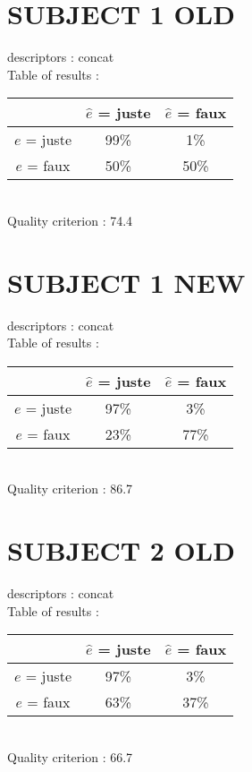 \newpage
\section*{SUBJECT 1 OLD}
descriptors : concat \\
Table of results : \\
\begin{tabular}{|c|c|c|}
\hline				& $\hat{e}$ = juste & $\hat{e}$ = faux \\
\hline  $e$ = juste	&     99\%			&      1\%		\\
\hline  $e$ = faux	&     50\%			&     50\%		\\
\hline
\end{tabular}\\
Quality criterion :   74.4 \\

\newpage
\section*{SUBJECT 1 NEW}
descriptors : concat \\
Table of results : \\
\begin{tabular}{|c|c|c|}
\hline				& $\hat{e}$ = juste & $\hat{e}$ = faux \\
\hline  $e$ = juste	&     97\%			&      3\%		\\
\hline  $e$ = faux	&     23\%			&     77\%		\\
\hline
\end{tabular}\\
Quality criterion :   86.7 \\

\newpage
\section*{SUBJECT 2 OLD}
descriptors : concat \\
Table of results : \\
\begin{tabular}{|c|c|c|}
\hline				& $\hat{e}$ = juste & $\hat{e}$ = faux \\
\hline  $e$ = juste	&     97\%			&      3\%		\\
\hline  $e$ = faux	&     63\%			&     37\%		\\
\hline
\end{tabular}\\
Quality criterion :   66.7 \\

\newpage
